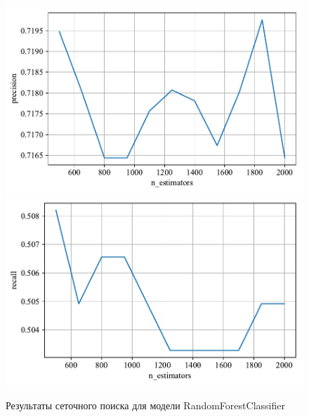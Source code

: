 \begin{figure}
    \centering
    \includegraphics{./images/toloka_randomforest_precision.pdf}
    \includegraphics{./images/toloka_randomforest_recall.pdf}
    \caption{Результаты сеточного поиска для модели RandomForestClassifier}
    \label{fig:toloka_randomforest}
\end{figure}

